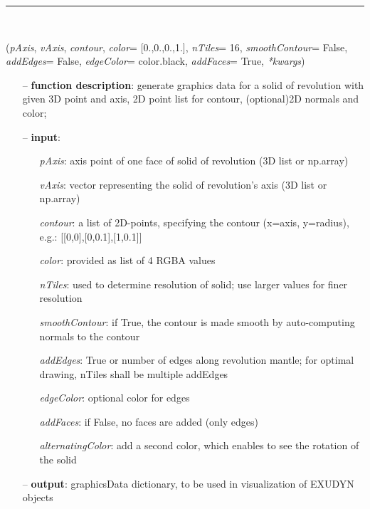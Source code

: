 \begin{itemize}[leftmargin=1.4cm]
\begin{itemize}[leftmargin=1.4cm]
\begin{itemize}[leftmargin=1.4cm]
\begin{itemize}[leftmargin=0.5cm]
\begin{itemize}[leftmargin=1.4cm]
\begin{itemize}[leftmargin=1.4cm]
\begin{itemize}[leftmargin=0.5cm]
\begin{itemize}[leftmargin=1.4cm]
%
\noindent\rule{8cm}{0.75pt}\vspace{1pt} \\ 
\begin{flushleft}
\label{sec:graphics:SolidOfRevolution}
({\it pAxis}, {\it vAxis}, {\it contour}, {\it color}= [0.,0.,0.,1.], {\it nTiles}= 16, {\it smoothContour}= False, {\it addEdges}= False, {\it edgeColor}= color.black, {\it addFaces}= True, {\it **kwargs})
\end{flushleft}
\setlength{\itemindent}{0.7cm}
\begin{itemize}[leftmargin=0.7cm]
\item[--]
{\bf function description}: generate graphics data for a solid of revolution with given 3D point and axis, 2D point list for contour, (optional)2D normals and color;
\item[--]
{\bf input}: \vspace{-6pt}
\begin{itemize}[leftmargin=1.2cm]
\setlength{\itemindent}{-0.7cm}
\item[]{\it pAxis}: axis point of one face of solid of revolution (3D list or np.array)
\item[]{\it vAxis}: vector representing the solid of revolution's axis (3D list or np.array)
\item[]{\it contour}: a list of 2D-points, specifying the contour (x=axis, y=radius), e.g.: [[0,0],[0,0.1],[1,0.1]]
\item[]{\it color}: provided as list of 4 RGBA values
\item[]{\it nTiles}: used to determine resolution of solid; use larger values for finer resolution
\item[]{\it smoothContour}: if True, the contour is made smooth by auto-computing normals to the contour
\item[]{\it addEdges}: True or number of edges along revolution mantle; for optimal drawing, nTiles shall be multiple addEdges
\item[]{\it edgeColor}: optional color for edges
\item[]{\it addFaces}: if False, no faces are added (only edges)
\item[]{\it alternatingColor}: add a second color, which enables to see the rotation of the solid
\end{itemize}
\item[--]
{\bf output}: graphicsData dictionary, to be used in visualization of EXUDYN objects

\end{itemize}
\end{itemize}
\end{itemize}
\end{itemize}
\end{itemize}
\end{itemize}
\end{itemize}
\end{itemize}
\end{itemize}
